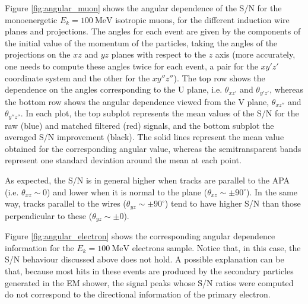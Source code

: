Figure \ref{fig:angular_muon} shows the angular dependence of the S/N for the monoenergetic $E_{k}=100 \ \mathrm{MeV}$ isotropic muons, for the different induction wire planes and projections. The angles for each event are given by the components of the initial value of the momentum of the particles, taking the angles of the projections on the $xz$ and $yz$ planes with respect to the $z$ axis (more accurately, one needs to compute these angles twice for each event, a pair for the $xy'z'$ coordinate system and the other for the $xy''z''$). The top row shows the dependence on the angles corresponding to the U plane, i.e. $\theta_{xz'}$ and $\theta_{y'z'}$, whereas the bottom row shows the angular dependence viewed from the V plane, $\theta_{xz''}$ and $\theta_{y''z''}$. In each plot, the top subplot represents the mean values of the S/N for the raw (blue) and matched filtered (red) signals, and the bottom subplot the averaged S/N improvement (black). The solid lines represent the mean value obtained for the corresponding angular value, whereas the semitransparent bands represent one standard deviation around the mean at each point.

As expected, the S/N is in general higher when tracks are parallel to the APA (i.e. $\theta_{xz} \sim 0$) and lower when it is normal to the plane ($\theta_{xz} \sim \pm 90^{\circ}$). In the same way, tracks parallel to the wires ($\theta_{yz} \sim \pm 90^{\circ}$) tend to have higher S/N than those perpendicular to these ($\theta_{yz} \sim \pm 0$).

Figure \ref{fig:angular_electron} shows the corresponding angular dependence information for the $E_{k}=100 \ \mathrm{MeV}$ electrons sample. Notice that, in this case, the S/N behaviour discussed above does not hold. A possible explanation can be that, because most hits in these events are produced by the secondary particles generated in the EM shower, the signal peaks whose S/N ratios were computed do not correspond to the directional information of the primary electron.

